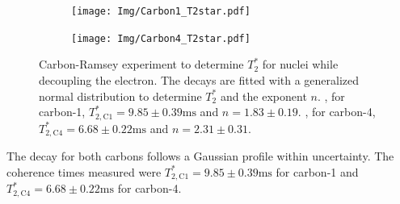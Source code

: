 \begin{figure}[htbp]
    \begin{subfigure}[t]{0.49\textwidth}\centering
        \caption{}
        \texttt{[image: Img/Carbon1\_T2star.pdf]}
        \label{fig:T2star_carbon1}
    \end{subfigure}
    \begin{subfigure}[t]{0.49\textwidth}\centering
        \caption{}
        \texttt{[image: Img/Carbon4\_T2star.pdf]}
        \label{fig:T2star_carbon4}
    \end{subfigure}
    \caption{Carbon-Ramsey experiment to determine $T_2^*$ for nuclei while decoupling the electron.
    The decays are fitted with a generalized normal distribution to determine $T_2^*$ and the exponent $n$.
    , for carbon-1, $T_{2,\mathrm{C1}}^* =9.85 \pm   0.39 \mathrm{ms}$ and $n= 1.83 \pm 0.19$.
    , for carbon-4,  $T_{2,\mathrm{C4}}^* =6.68 \pm   0.22 \mathrm{ms}$ and $n= 2.31 \pm 0.31$. } %
    \label{fig:T2star_carbon}
\end{figure}

The decay for both carbons follows a Gaussian profile within uncertainty.
The coherence times measured were $T_{2,\mathrm{C1}}^* =9.85 \pm   0.39 \mathrm{ms}$ for carbon-1 and $T_{2,\mathrm{C4}}^* =6.68 \pm   0.22 \mathrm{ms}$ for carbon-4.


